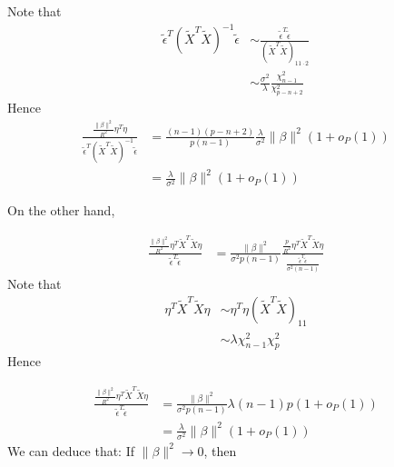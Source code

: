 \documentclass[review]{elsarticle}
\theoremstyle{plain}
\theoremstyle{definition}
\theoremstyle{remark}
\begin{document}
Note that
\begin{equation}
    \begin{aligned}
        \tilde{\epsilon}^T{(\tilde{X}^T\tilde{X})}^{-1}\tilde{\epsilon}&\sim
        \frac{\tilde{\epsilon}^T\tilde{\epsilon}}{{(\tilde{X}^T\tilde{X})}_{11\cdot 2}}\\
        &\sim\frac{\sigma^2}{\lambda}\frac{\chi^2_{n-1}}{\chi^2_{p-n+2}}
    \end{aligned}
\end{equation}
Hence
\begin{equation}
    \begin{aligned}
    \frac{\frac{\|\beta\|^2}{R^2} \eta^T\eta
        }{\tilde{\epsilon}^T{(\tilde{X}^T\tilde{X})}^{-1}\tilde{\epsilon}}&=
        \frac{(n-1)(p-n+2)}{p(n-1)}\frac{\lambda}{\sigma^2}\|\beta\|^2(1+o_P(1))\\
        &=\frac{\lambda}{\sigma^2}\|\beta\|^2(1+o_P(1))
    \end{aligned}
\end{equation}

On the other hand,

\begin{equation}
    \begin{aligned}
        \frac{\frac{\|\beta\|^2}{R^2} \eta^T\tilde{X}^T\tilde{X}\eta
        }{\tilde{\epsilon}^T\tilde{\epsilon}}&=
        \frac{\|\beta\|^2}{\sigma^2 p(n-1)}
        \frac{\frac{p}{R^2} \eta^T\tilde{X}^T\tilde{X}\eta
        }{\frac{\tilde{\epsilon}^T\tilde{\epsilon}}{\sigma^2(n-1)}}
    \end{aligned}
\end{equation}
Note that
\begin{equation}
    \begin{aligned}
        \eta^T\tilde{X}^T\tilde{X}\eta&\sim
        \eta^T\eta {(\tilde{X}^T\tilde{X})}_{11}\\
        &\sim \lambda\chi^2_{n-1} \chi^2_{p}
    \end{aligned}
\end{equation}
Hence

\begin{equation}
    \begin{aligned}
        \frac{\frac{\|\beta\|^2}{R^2} \eta^T\tilde{X}^T\tilde{X}\eta
        }{\tilde{\epsilon}^T\tilde{\epsilon}}&=
        \frac{\|\beta\|^2}{\sigma^2 p(n-1)}
        \lambda (n-1)p
        (1+o_P(1))\\
        &=\frac{\lambda}{\sigma^2}\|\beta\|^2(1+o_P(1))
    \end{aligned}
\end{equation}
We can deduce that:
If $\|\beta\|^2\to 0$, then
\end{document}
